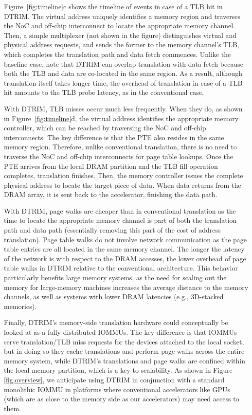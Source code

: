 Figure~\ref{fig:timeline}c shows the timeline of events
in case of a TLB hit in DTRIM. The virtual address uniquely identifies a
memory region and traverses the NoC and off-chip interconnect to
locate the appropriate memory channel. Then, a simple multiplexer (not
shown in the figure) distinguishes virtual and physical address
requests, and sends the former to the memory channel's TLB, which
completes the translation path and data fetch commences. Unlike the baseline case, note
that DTRIM can overlap translation with data fetch because
both the TLB and data are co-located in the same region. As a result, although 
translation itself takes longer time, the overhead of translation in case of a TLB hit 
amounts to the TLB probe latency, as in the conventional case.

With DTRIM, TLB misses occur much less frequently. When they do, as
shown in Figure~\ref{fig:timeline}d, the virtual address
identifies the appropriate memory controller, which can be reached by
traversing the NoC and off-chip interconnects. The key difference is that
the PTE also resides in the same memory region. Therefore, unlike conventional translation, there is no need
to traverse the NoC and off-chip interconnects for page table
lookups. Once the PTE arrives from the local DRAM partition and the
TLB fill operation completes, translation finishes. Then, the memory
controller issues the complete physical address to locate the target
piece of data. When data returns from the DRAM array, it is sent back
to the accelerator, finishing the data
path.

With DTRIM, page walks are cheaper than in conventional translation as
the time to locate the appropriate memory channel is part of both the
translation path and data path (essentially removing this part of the
cost of address translation). Page table walks do not involve network
communication as the page table entries are all located in the same
memory channel. The longer the latency of the network is with respect
to the DRAM accesses, the lower overhead of page table walks in DTRIM
relative to the conventional architecture. This behavior particularly
benefits large memory systems, as the need for scaling out the memory
for large-memory machines increases the average distance to the memory
channels, as well as systems with lower DRAM latencies (e.g.,
3D-stacked memories).

Finally, DTRIM's memory-side translation hardware could conceptually
be looked at as a fully distributed IOMMUs. The key difference is that
IOMMUs serve translation/TLB miss requests for the devices attached to
the local socket, but in doing so they cache translations and perform
page walks across the entire memory system, while DTRIM's translations
and page walks are confined within the local memory partition, which
is a key to scalability. As shown in Figure
\ref{fig:overview}, we anticipate using DTRIM in conjunction with a
standard monolithic IOMMU in platforms where conventional accelerators
like GPUs (which are as close to the memory side as our
accelerators) may need access to them. 

